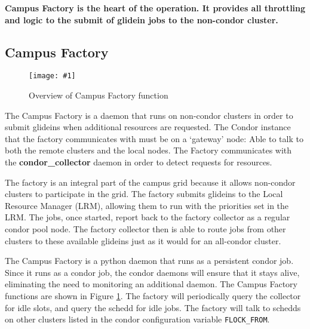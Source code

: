 \documentclass[11pt]{article}
\newlength{\imgwidth}
\newcommand\scalegraphics[1]{%
    \settowidth{\imgwidth}{\texttt{[image: \#1]}}%
    \setlength{\imgwidth}{\minof{\imgwidth}{\textwidth}}%
    \texttt{[image: \#1]}%
}
\begin{document}



\textbf{ Campus Factory is the heart of the operation.  It provides all throttling and logic to the submit of glidein jobs to the non-condor cluster.}

\subsection{Campus Factory}
\begin{figure}[ht]
\centering
\scalegraphics{images/FactoryOverview.pdf}
\caption{Overview of Campus Factory function}
\label{fig:campusfactoryoverview}
\end{figure}
The Campus Factory is a daemon that runs on non-condor clusters in order to submit glideins when additional resources are requested.  The Condor instance that the factory communicates with must be on a `gateway' node: Able to talk to both the remote clusters and the local nodes.   The Factory communicates with the \textbf{condor_collector} daemon in order to detect requests for resources.  

The factory is an integral part of the campus grid because it allows non-condor clusters to participate in the grid.  The factory submits glideins to the Local Resource Manager (LRM), allowing them to run with the priorities set in the LRM.  The jobs, once started, report back to the factory collector as a regular condor pool node.  The factory collector then is able to route jobs from other clusters to these available glideins just as it would for an all-condor cluster.

The Campus Factory is a python daemon that runs as a persistent condor job.  Since it runs as a condor job, the condor daemons will ensure that it stays alive, eliminating the need to monitoring an additional daemon.  The Campus Factory functions are shown in Figure \ref{fig:campusfactoryoverview}.  The factory will periodically query the collector for idle slots, and query the schedd for idle jobs.  The factory will talk to schedds on other clusters listed in the condor configuration variable \texttt{FLOCK\_FROM}.
\end{document}
